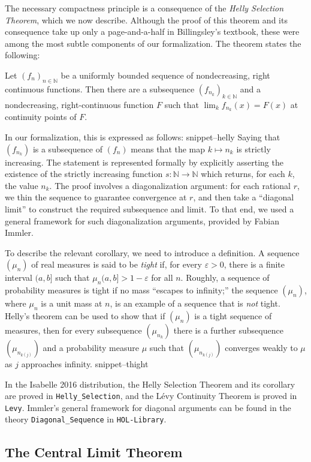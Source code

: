 \documentclass{svjour3}
\newcommand{\NN}{\mathbb{N}}
\newcommand{\Snippet}[1]{\csname snippet--#1\endcsname}
\begin{document}
The necessary compactness principle is a consequence of the \emph{Helly Selection Theorem}, which we now describe. Although the proof of this theorem and its consequence take up only a page-and-a-half in Billingsley's textbook, these were among the most subtle components of our formalization. The theorem states the following:
\begin{theorem}
Let $(f_n)_{n \in \NN}$ be a uniformly bounded sequence of nondecreasing, right continuous functions. Then there are a subsequence $(f_{n_k})_{k \in \NN}$ and a nondecreasing, right-continuous function $F$ such that $\lim_k f_{n_k}(x) = F(x)$ at continuity points of $F$.
\end{theorem}
In our formalization, this is expressed as follows:
\Snippet{helly}
Saying that $(f_{n_k})$ is a subsequence of $(f_n)$ means that the map $k \mapsto n_k$ is strictly increasing. The statement is represented formally by explicitly asserting the existence of the strictly increasing function $s : \NN \to \NN$ which returns, for each $k$, the value $n_k$. The proof involves a diagonalization argument: for each rational $r$, we thin the sequence to guarantee convergence at $r$, and then take a ``diagonal limit'' to construct the required subsequence and limit. To that end, we used a general framework for such diagonalization arguments, provided by Fabian Immler.

To describe the relevant corollary, we need to introduce a definition. A sequence $(\mu_n)$ of real measures is said to be \emph{tight} if, for every $\varepsilon > 0$, there is a finite interval $(a, b]$ such that $\mu_n(a, b] > 1 - \varepsilon$ for all $n$. Roughly, a sequence of probability measures is tight if no mass ``escapes to infinity;'' the sequence $(\mu_n)$, where $\mu_n$ is a unit mass at $n$, is an example of a sequence that is \emph{not} tight. Helly's theorem can be used to show that if $(\mu_n)$ is a tight sequence of measures, then for every subsequence $(\mu_{n_k})$ there is a further subsequence $(\mu_{n_{k(j)}})$ and a probability measure $\mu$ such that $(\mu_{n_{k(j)}})$ converges weakly to $\mu$ as $j$ approaches infinity.
\Snippet{thight}

In the Isabelle 2016 distribution, the Helly Selection Theorem and its corollary are proved in \texttt{Helly\_Selection}, and the L\'evy Continuity Theorem is proved in \texttt{Levy}. Immler's general framework for diagonal arguments can be found in the theory \texttt{Diagonal\_Sequence} in \texttt{HOL-Library}.

\subsection{The Central Limit Theorem}
\end{document}
